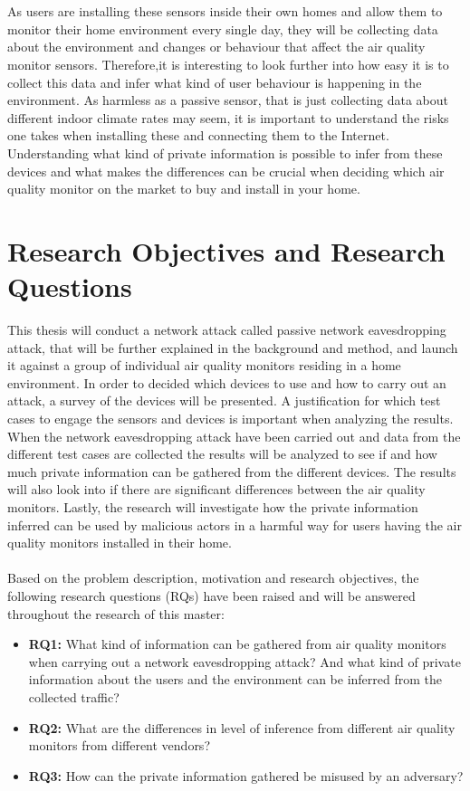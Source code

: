 \\\\
As users are installing these sensors inside their own homes and allow them to monitor their home environment every single day, they will be collecting data about the environment and changes or behaviour that affect the air quality monitor sensors. Therefore,it is interesting to look further into how easy it is to collect this data and infer what kind of user behaviour is happening in the environment. As harmless as a passive sensor, that is just collecting data about different indoor climate rates may seem, it is important to understand the risks one takes when installing these and connecting them to the Internet. Understanding what kind of private information is possible to infer from these devices and what makes the differences can be crucial when deciding which air quality monitor on the market to buy and install in your home.

\section{Research Objectives and Research Questions}
This thesis will conduct a network attack called passive network eavesdropping attack, that will be further explained in the background and method, and launch it against a group of individual air quality monitors residing in a home environment. In order to decided which devices to use and how to carry out an attack, a survey of the devices will be presented. A justification for which test cases to engage the sensors and devices is important when analyzing the results. When the network eavesdropping attack have been carried out and data  from the different test cases are collected the results will be analyzed to see if and how much private information can be gathered from the different devices. The results will also look into if there are significant differences between the air quality monitors. Lastly, the research will investigate how the private information inferred can be used by malicious actors in a harmful way for users having the air quality monitors installed in their home.
\\\\
Based on the problem description, motivation and research objectives, the following research questions (RQs) have been raised and will be answered throughout the research of this master:
\begin{itemize}
    \item 
    \textbf{RQ1:} What kind of information can be gathered from air quality monitors when carrying out a network eavesdropping attack? And what kind of private information about the users and the environment can be inferred from the collected traffic?\\
    \item 
    \textbf{RQ2:} What are the differences in level of inference from different air quality monitors from different vendors?\\
    \item 
    \textbf{RQ3:} How can the private information gathered be misused by an adversary?\\
\end{itemize}

